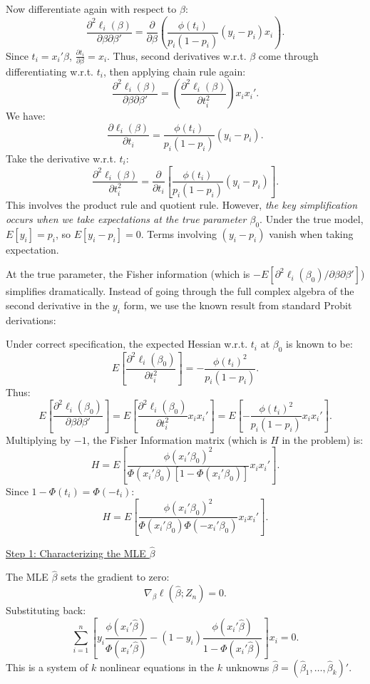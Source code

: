 \documentclass[a4paper,12pt]{article} %
\theoremstyle{nonitalic}
\newenvironment{solution}[1]
  {\renewcommand\theinnercustomsol{#1}\innercustomsol}
  {\endinnercustomsol}
\newcounter{solutionctr}[section]
\renewcommand{\thesolutionctr}{(\alph{solutionctr})}
\newenvironment{autosolution}
  {\stepcounter{solutionctr}\begin{solution}{\thesolutionctr}}
  {\end{solution}}
\begin{document}
\begin{autosolution}
    Now differentiate again with respect to $\beta$:
    \[
    \frac{\partial^2 \ell_i(\beta)}{\partial \beta \partial \beta'} = \frac{\partial}{\partial \beta}\left(\frac{\phi(t_i)}{p_i(1-p_i)}(y_i - p_i) x_i\right).
    \]
    Since $t_i = x_i'\beta$, $\frac{\partial t_i}{\partial \beta} = x_i$. Thus, second derivatives w.r.t. $\beta$ come through differentiating w.r.t. $t_i$, then applying chain rule again:
    \[
    \frac{\partial^2 \ell_i(\beta)}{\partial \beta \partial \beta'} = \left(\frac{\partial^2 \ell_i(\beta)}{\partial t_i^2}\right) x_i x_i'.
    \]
    We have:
    \[
    \frac{\partial \ell_i(\beta)}{\partial t_i} = \frac{\phi(t_i)}{p_i(1-p_i)}(y_i - p_i).
    \]
    Take the derivative w.r.t. $t_i$:
    \[
    \frac{\partial^2 \ell_i(\beta)}{\partial t_i^2} 
    = \frac{\partial}{\partial t_i}\left[\frac{\phi(t_i)}{p_i(1-p_i)}(y_i - p_i)\right].
    \]
    This involves the product rule and quotient rule. However, \textit{the key simplification occurs when we take expectations at the true parameter $\beta_0$}. Under the true model, $E[y_i]=p_i$, so $E[y_i - p_i]=0$. Terms involving $(y_i - p_i)$ vanish when taking expectation.

    At the true parameter, the Fisher information (which is $-E[\partial^2 \ell_i(\beta_0)/\partial \beta \partial \beta']$) simplifies dramatically. Instead of going through the full complex algebra of the second derivative in the $y_i$ form, we use the known result from standard Probit derivations:

    Under correct specification, the expected Hessian w.r.t. $t_i$ at $\beta_0$ is known to be:
    \[
    E\left[\frac{\partial^2 \ell_i(\beta_0)}{\partial t_i^2}\right] = -\frac{\phi(t_i)^2}{p_i(1-p_i)}.
    \]
    Thus:
    \[
    E\left[\frac{\partial^2 \ell_i(\beta_0)}{\partial \beta \partial \beta'}\right] 
    = E\left[\frac{\partial^2 \ell_i(\beta_0)}{\partial t_i^2} x_i x_i'\right] 
    = E\left[-\frac{\phi(t_i)^2}{p_i(1-p_i)} x_i x_i'\right].
    \]
    Multiplying by $-1$, the Fisher Information matrix (which is $H$ in the problem) is:
    \[
    H = E\left[\frac{\phi(x_i'\beta_0)^2}{\Phi(x_i'\beta_0)[1-\Phi(x_i'\beta_0)]} x_i x_i'\right].
    \]
    Since $1-\Phi(t_i)=\Phi(-t_i)$:
    \[
    H = E\left[\frac{\phi(x_i'\beta_0)^2}{\Phi(x_i'\beta_0)\Phi(-x_i'\beta_0)} x_i x_i'\right].
    \]

    \underline{Step 1: Characterizing the MLE $\hat{\beta}$}
    
    The MLE $\hat{\beta}$ sets the gradient to zero:
    \[
    \nabla_{\beta}\ell(\hat{\beta};Z_n) = 0.
    \]
    Substituting back:
    \[
    \sum_{i=1}^n \left[ y_i \frac{\phi(x_i'\hat{\beta})}{\Phi(x_i'\hat{\beta})} - (1-y_i)\frac{\phi(x_i'\hat{\beta})}{1-\Phi(x_i'\hat{\beta})} \right] x_i = 0.
    \]
    This is a system of $k$ nonlinear equations in the $k$ unknowns $\hat{\beta} = (\hat{\beta}_1, \ldots, \hat{\beta}_k)'$.
    

\end{autosolution}
\end{document}
